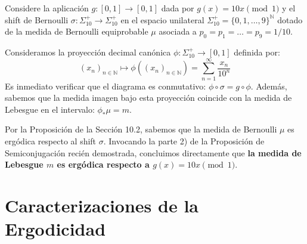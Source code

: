 \begin{ejemplo}
	Considere la aplicación $g: [0,1] \to [0,1]$ dada por $g(x) = 10x \pmod 1$ y el shift de Bernoulli $\sigma: \Sigma_{10}^+ \to \Sigma_{10}^+$ en el espacio unilateral $\Sigma_{10}^+ = \{0, 1, \dots, 9\}^{\mathbb{N}}$ dotado de la medida de Bernoulli equiprobable $\mu$ asociada a $p_0 = p_1 = \dots = p_9 = 1/10$.
	
	Consideramos la proyección decimal canónica $\phi: \Sigma_{10}^+ \to [0,1]$ definida por:
	$$ (x_n)_{n \in \mathbb{N}} \mapsto \phi((x_n)_{n \in \mathbb{N}}) = \sum_{n=1}^\infty \frac{x_n}{10^n} $$
	Es inmediato verificar que el diagrama es conmutativo: $\phi \circ \sigma = g \circ \phi$. Además, sabemos que la medida imagen bajo esta proyección coincide con la medida de Lebesgue en el intervalo: $\phi_* \mu = m$.
	
	Por la Proposición de la Sección 10.2, sabemos que la medida de Bernoulli $\mu$ es ergódica respecto al shift $\sigma$. Invocando la parte 2) de la Proposición de Semiconjugación recién demostrada, concluimos directamente que \textbf{la medida de Lebesgue $m$ es ergódica respecto a $g(x) = 10x \pmod 1$}.
\end{ejemplo}

\section{Caracterizaciones de la Ergodicidad}

